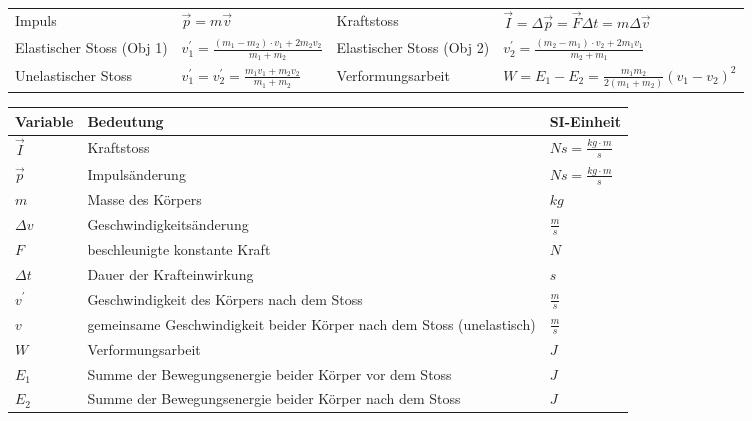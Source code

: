 \documentclass[
a4paper,
oneside,
landscape, 
8pt,
]{scrartcl}
\begin{document}
\begin{multicols*}{2}
\begin{tabbing}
	\begin{tabu} to \linewidth {X l X l}
		\toprule
		Impuls & $\vec{p} = m \vec{v}$  &
		Kraftstoss & $\vec{I} = \Delta \vec{p} = \vec{F} \Delta t = m \Delta \vec{v}$ \\
		Elastischer Stoss (Obj 1) & $v_1^{'} = \frac{(m_1 - m_2) \cdot v_1 + 2 m_2 v_2}{m_1+m_2}$  &
		Elastischer Stoss (Obj 2) & $v_2^{'} = \frac{(m_2 - m_1) \cdot v_2 + 2 m_1 v_1}{m_2+m_1}$ \\
		Unelastischer Stoss & $v_1^{'} = v_2^{'} = \frac{m_1v_1 + m_2v_2}{m_1 + m_2}$ & Verformungsarbeit & $W = E_1 - E_2 = \frac{m_1m_2}{2(m_1+m_2)}(v_1-v_2)^2$ \\
	\end{tabu}
\end{tabbing}

\begin{tabbing}
	\begin{tabu} to \linewidth {l X l}
		Variable & Bedeutung & SI-Einheit \\
		\midrule
		$\vec{I}$ & Kraftstoss & $Ns = \frac{kg \cdot m}{s}$ \\
		$\vec{p}$ & Impulsänderung & $Ns = \frac{kg \cdot m}{s}$ \\
		$m$ & Masse des Körpers & $kg$ \\
		$\Delta v$ & Geschwindigkeitsänderung & $\frac{m}{s}$  \\
		$F$ & beschleunigte konstante Kraft & $N$ \\
		$\Delta t$ & Dauer der Krafteinwirkung & $s$ \\
		$v^{'}$ & Geschwindigkeit des Körpers nach dem Stoss & $\frac{m}{s}$\\
		$v$ & gemeinsame Geschwindigkeit beider Körper nach dem Stoss (unelastisch) & $\frac{m}{s}$ \\
		$W$ & Verformungsarbeit & $J$\\
		$E_1$ & Summe der Bewegungsenergie beider Körper vor dem Stoss & $J$\\
		$E_2$ & Summe der Bewegungsenergie beider Körper nach dem Stoss & $J$\\
		\bottomrule
	\end{tabu}
\end{tabbing}



\end{multicols*}
\end{document}
